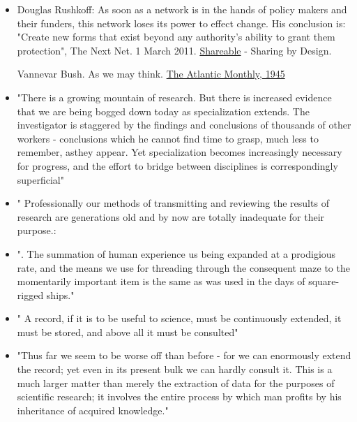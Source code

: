 \documentclass[final,authoryear,3p]{elsarticle-open-drafting}
\begin{document}
\begin{itemize}
	\item  Douglas Rushkoff: As soon as a network is in the hands of policy makers and their funders, this network loses its power to effect change. His conclusion is: "Create new forms that exist beyond any authority's ability to grant them protection", The Next Net. 1 March 2011. \href{http://shareable.net/blog/the-next-net}{Shareable} - Sharing by Design. 

Vannevar Bush. As we may think. \href{http://web.mit.edu/STS.035/www/PDFs/think.pdf}{The Atlantic Monthly, 1945}
	\item "There is a growing mountain of research. But there is increased evidence that we are being bogged down today as specialization extends. The investigator is staggered by the findings and conclusions of thousands of other workers - conclusions which he cannot find time to grasp, much less to remember, asthey appear. Yet specialization becomes increasingly necessary for progress, and the effort to bridge between disciplines is correspondingly superficial"
	\item "
Professionally our methods of transmitting and reviewing the results of research are generations old and
by now are totally inadequate for their purpose.:

	\item ". The summation of human experience us being expanded at a prodigious rate, and
the means we use for threading through the consequent maze to the momentarily important item is the
same as was used in the days of square-rigged ships."
	\item "
A record, if it is to be useful to science, must be continuously extended, it must be stored, and above all it
must be consulted"
	\item "Thus far we seem to be worse
off than before - for we can enormously extend the record; yet even in its present bulk we can hardly
consult it. This is a much larger matter than merely the extraction of data for the purposes of scientific
research; it involves the entire process by which man profits by his inheritance of acquired knowledge."
\end{itemize}
\end{document}
